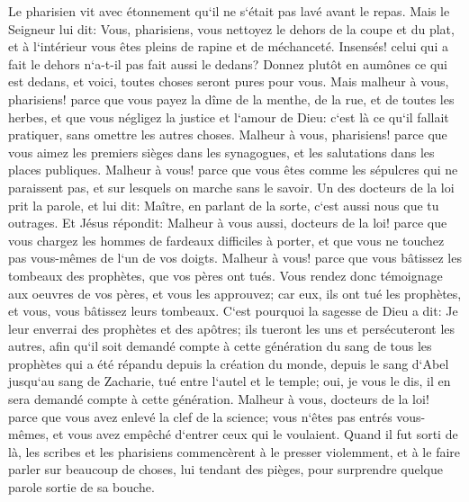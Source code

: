 \verse Le pharisien vit avec étonnement qu`il ne s`était pas lavé avant le repas. 
\verse Mais le Seigneur lui dit: Vous, pharisiens, vous nettoyez le dehors de la coupe et du plat, et à l`intérieur vous êtes pleins de rapine et de méchanceté. 
\verse Insensés! celui qui a fait le dehors n`a-t-il pas fait aussi le dedans? 
\verse Donnez plutôt en aumônes ce qui est dedans, et voici, toutes choses seront pures pour vous. 
\verse Mais malheur à vous, pharisiens! parce que vous payez la dîme de la menthe, de la rue, et de toutes les herbes, et que vous négligez la justice et l`amour de Dieu: c`est là ce qu`il fallait pratiquer, sans omettre les autres choses. 
\verse Malheur à vous, pharisiens! parce que vous aimez les premiers sièges dans les synagogues, et les salutations dans les places publiques. 
\verse Malheur à vous! parce que vous êtes comme les sépulcres qui ne paraissent pas, et sur lesquels on marche sans le savoir. 
\verse Un des docteurs de la loi prit la parole, et lui dit: Maître, en parlant de la sorte, c`est aussi nous que tu outrages. 
\verse Et Jésus répondit: Malheur à vous aussi, docteurs de la loi! parce que vous chargez les hommes de fardeaux difficiles à porter, et que vous ne touchez pas vous-mêmes de l`un de vos doigts. 
\verse Malheur à vous! parce que vous bâtissez les tombeaux des prophètes, que vos pères ont tués. 
\verse Vous rendez donc témoignage aux oeuvres de vos pères, et vous les approuvez; car eux, ils ont tué les prophètes, et vous, vous bâtissez leurs tombeaux. 
\verse C`est pourquoi la sagesse de Dieu a dit: Je leur enverrai des prophètes et des apôtres; ils tueront les uns et persécuteront les autres, 
\verse afin qu`il soit demandé compte à cette génération du sang de tous les prophètes qui a été répandu depuis la création du monde, 
\verse depuis le sang d`Abel jusqu`au sang de Zacharie, tué entre l`autel et le temple; oui, je vous le dis, il en sera demandé compte à cette génération. 
\verse Malheur à vous, docteurs de la loi! parce que vous avez enlevé la clef de la science; vous n`êtes pas entrés vous-mêmes, et vous avez empêché d`entrer ceux qui le voulaient. 
\verse Quand il fut sorti de là, les scribes et les pharisiens commencèrent à le presser violemment, et à le faire parler sur beaucoup de choses, 
\verse lui tendant des pièges, pour surprendre quelque parole sortie de sa bouche. 

\chapter{}

